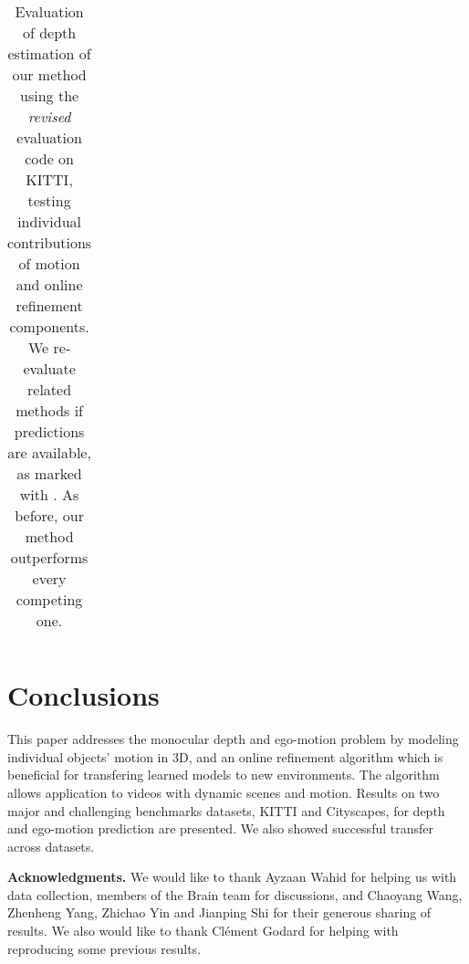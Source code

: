 \documentclass[10pt,twocolumn,letterpaper]{article}
\begin{document}
\begin{table*}[t]
{\begin{tabular}{|l|c|c|c||c|c|c|c|c|c|c|}
  \hline
  \end{tabular}
  }
  \vspace{10pt}
  \caption{Evaluation of depth estimation of our method using the \textit{revised} evaluation code on KITTI, testing individual contributions of motion and online refinement components. We re-evaluate related methods if predictions are available, as marked with . As before, our method outperforms every competing one.}
  \label{tab:kitti_eigenfixed}
    \vspace{-10pt}
\end{table*}

\section{Conclusions}
This paper addresses the monocular depth and ego-motion problem by modeling individual objects' motion in 3D, and an online refinement algorithm which is beneficial for transfering learned models to new environments. The algorithm allows application to videos with dynamic scenes and motion. Results on two major and challenging benchmarks datasets, KITTI and City\-scapes, for depth and ego-motion prediction are presented. We also showed successful transfer across datasets.

\textbf{Acknowledgments.}
We would like to thank Ayzaan Wahid for helping us with data collection, members of the Brain team for discussions, and
Chaoyang Wang, Zhenheng Yang, Zhichao Yin and Jianping Shi for their generous sharing of results. We also would like to thank Cl\'ement Godard for helping with reproducing some previous results.

{\small


}
\end{document}
